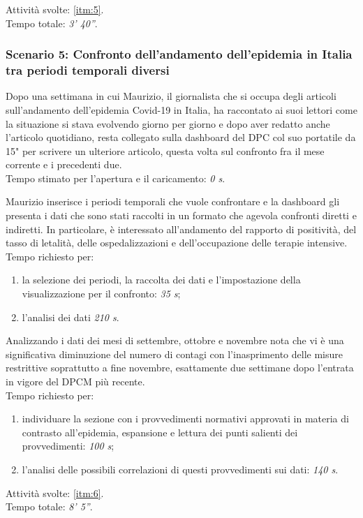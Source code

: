 \noindent
Attività svolte: \ref{itm:5}.\\  
Tempo totale: \textit{3' 40''}. 

\subsubsection*{Scenario 5: Confronto dell'andamento dell'epidemia in Italia tra periodi temporali diversi}
Dopo una settimana in cui Maurizio, il giornalista che si occupa degli articoli sull'andamento dell'epidemia Covid-19 in Italia, ha raccontato ai suoi lettori come la situazione si stava evolvendo giorno per giorno e dopo aver redatto anche l'articolo quotidiano, resta collegato sulla dashboard del DPC col suo portatile da 15" per scrivere un ulteriore articolo, questa volta sul confronto fra il mese corrente e i precedenti due.\\
Tempo stimato per l'apertura e il caricamento: \textit{0 s}.

Maurizio inserisce i periodi temporali che vuole confrontare e la dashboard gli presenta i dati che sono stati raccolti in un formato che agevola confronti diretti e indiretti. In particolare, è interessato all'andamento del rapporto di positività, del tasso di letalità, delle ospedalizzazioni e dell'occupazione delle terapie intensive.\\
Tempo richiesto per:
\begin{enumerate}
    \item la selezione dei periodi, la raccolta dei dati e l'impostazione della visualizzazione per il confronto: \textit{35 s};
    \item l'analisi dei dati \textit{210 s}.
\end{enumerate}

Analizzando i dati dei mesi di settembre, ottobre e novembre nota che vi è una significativa diminuzione del numero di contagi con l'inasprimento delle misure restrittive soprattutto a fine novembre, esattamente due settimane dopo l'entrata in vigore del DPCM più recente.\\
Tempo richiesto per:
\begin{enumerate}
    \item individuare la sezione con i provvedimenti normativi approvati in materia di contrasto all'epidemia, espansione e lettura dei punti salienti dei provvedimenti: \textit{100 s};
    \item l'analisi delle possibili correlazioni di questi provvedimenti sui dati: \textit{140 s}.
\end{enumerate}
\noindent
Attività svolte: \ref{itm:6}.\\ 
Tempo totale: \textit{8' 5''}. 
